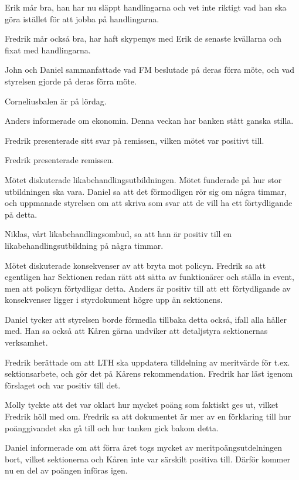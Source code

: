 \documentclass[10pt]{article}
\begin{document}
\begin{paragrafer}
\begin{paragrafer}
Erik mår bra, han har nu släppt handlingarna och vet inte riktigt vad han ska göra istället för att jobba på handlingarna.

Fredrik mår också bra, har haft skypemys med Erik de senaste kvällarna och fixat med handlingarna.

John och Daniel sammanfattade vad FM beslutade på deras förra möte, och vad styrelsen gjorde på deras förra möte.

Corneliusbalen är på lördag.

Anders informerade om ekonomin. Denna veckan har banken stått ganska stilla.

\end{paragrafer}

Fredrik presenterade sitt svar på remissen, vilken mötet var positivt till.

Fredrik presenterade remissen.

Mötet diskuterade likabehandlingsutbildningen. Mötet funderade på hur stor utbildningen ska vara. Daniel sa att det förmodligen rör sig om några timmar, och uppmanade styrelsen om att skriva som svar att de vill ha ett förtydligande på detta.

Niklas, vårt likabehandlingsombud, sa att han är positiv till en likabehandlingsutbildning på några timmar.

Mötet diskuterade konsekvenser av att bryta mot policyn. Fredrik sa att egentligen har Sektionen redan rätt att sätta av funktionärer och ställa in event, men att policyn förtydligar detta. Anders är positiv till att ett förtydligande av konsekvenser ligger i styrdokument högre upp än sektionens.

Daniel tycker att styrelsen borde förmedla tillbaka detta också, ifall alla håller med. Han sa också att Kåren gärna undviker att detaljstyra sektionernas verksamhet.

Fredrik berättade om att LTH ska uppdatera tilldelning av meritvärde för t.ex. sektionsarbete, och gör det på Kårens rekommendation. Fredrik har läst igenom förslaget och var positiv till det.

Molly tyckte att det var oklart hur mycket poäng som faktiskt ges ut, vilket Fredrik höll med om. Fredrik sa att dokumentet är mer av en förklaring till hur poänggivandet ska gå till och hur tanken gick bakom detta.

Daniel informerade om att förra året togs mycket av meritpoängsutdelningen bort, vilket sektionerna och Kåren inte var särskilt positiva till. Därför kommer nu en del av poängen införas igen.


\end{paragrafer}
\end{document}
